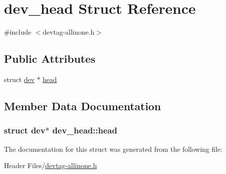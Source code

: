 \hypertarget{structdev__head}{\section{dev\-\_\-head \-Struct \-Reference}
\label{structdev__head}
}


{\ttfamily \#include $<$devtag-\/allinone.\-h$>$}

\subsection*{\-Public \-Attributes}
\begin{DoxyCompactItemize}
\item 
struct \hyperlink{structdev}{dev} $\ast$ \hyperlink{structdev__head_aebfcd191f8c9b6d1d71e562e32cc00c6}{head}
\end{DoxyCompactItemize}


\subsection{\-Member \-Data \-Documentation}
\hypertarget{structdev__head_aebfcd191f8c9b6d1d71e562e32cc00c6}{
\subsubsection[{head}]{\setlength{\rightskip}{0pt plus 5cm}struct {\bf dev}$\ast$ {\bf dev\-\_\-head\-::head}}}\label{structdev__head_aebfcd191f8c9b6d1d71e562e32cc00c6}


\-The documentation for this struct was generated from the following file\-:\begin{DoxyCompactItemize}
\item 
\-Header Files/\hyperlink{devtag-allinone_8h}{devtag-\/allinone.\-h}\end{DoxyCompactItemize}
